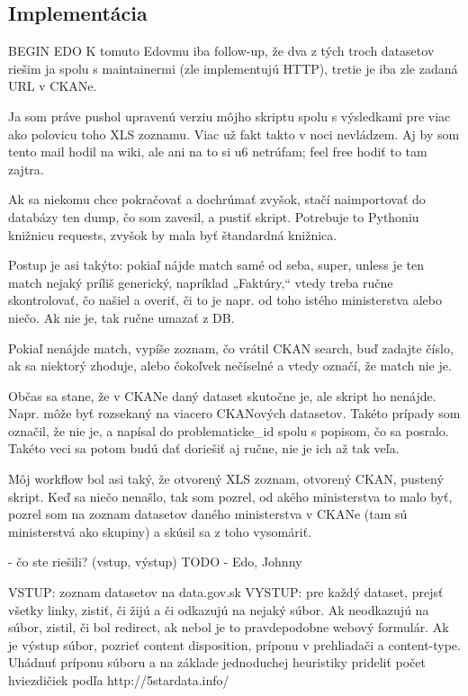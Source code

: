 \documentclass[12pt,a4paper]{article}
\begin{document}
\subsection{Implementácia}


BEGIN EDO 
K tomuto Edovmu iba follow-up, že dva z tých troch datasetov riešim ja spolu s maintainermi (zle implementujú HTTP), tretie je iba zle zadaná URL v CKANe.

Ja som práve pushol upravenú verziu môjho skriptu spolu s výsledkami pre viac ako polovicu toho XLS zoznamu. Viac už fakt takto v noci nevládzem. Aj by som tento mail hodil na wiki, ale ani na to si u6 netrúfam; feel free hodiť to tam zajtra.

Ak sa niekomu chce pokračovať a dochrúmať zvyšok, stačí naimportovať do databázy ten dump, čo som zavesil, a pustiť skript. Potrebuje to Pythoniu knižnicu requests, zvyšok by mala byť štandardná knižnica.

Postup je asi takýto: pokiaľ nájde match samé od seba, super, unless je ten match nejaký príliš generický, napríklad „Faktúry,“ vtedy treba ručne skontrolovať, čo našiel a overiť, či to je napr. od toho istého ministerstva alebo niečo. Ak nie je, tak ručne umazať z DB.

Pokiaľ nenájde match, vypíše zoznam, čo vrátil CKAN search, buď zadajte číslo, ak sa niektorý zhoduje, alebo čokoľvek nečíselné a vtedy označí, že match nie je.

Občas sa stane, že v CKANe daný dataset skutočne je, ale skript ho nenájde. Napr. môže byť rozsekaný na viacero CKANových datasetov. Takéto prípady som označil, že nie je, a napísal do problematicke\_id spolu s popisom, čo sa posralo. Takéto veci sa potom budú dať doriešiť aj ručne, nie je ich až tak veľa.

Môj workflow bol asi taký, že otvorený XLS zoznam, otvorený CKAN, pustený skript. Keď sa niečo nenašlo, tak som pozrel, od akého ministerstva to malo byť, pozrel som na zoznam datasetov daného ministerstva v CKANe (tam sú ministerstvá ako skupiny) a skúsil sa z toho vysomáriť.

  - čo ste riešili? (vstup, výstup)
TODO - Edo, Johnny 

VSTUP: zoznam datasetov na data.gov.sk
VYSTUP: pre každý dataset, prejsť všetky linky, zistiť, či žijú a či odkazujú na nejaký súbor.
      Ak neodkazujú na súbor, zistil, či bol redirect, ak nebol je to pravdepodobne webový formulár. 
      Ak je výstup súbor, pozrieť content disposition, príponu v prehliadači a content-type. Uhádnuť príponu súboru a na základe 
       jednoduchej heuristiky prideliť počet hviezdičiek podľa http://5stardata.info/
\end{document}
